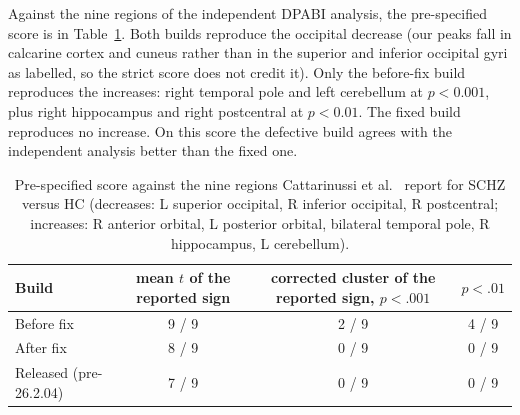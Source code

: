 \documentclass[11pt]{article}
\begin{document}
Against the nine regions of the independent DPABI analysis, the pre-specified score is in Table~\ref{tab:score}. Both builds reproduce the occipital decrease (our peaks fall in calcarine cortex and cuneus rather than in the superior and inferior occipital gyri as labelled, so the strict score does not credit it). Only the before-fix build reproduces the increases: right temporal pole and left cerebellum at $p < 0.001$, plus right hippocampus and right postcentral at $p < 0.01$. The fixed build reproduces no increase. On this score the defective build agrees with the independent analysis better than the fixed one.

\begin{table}[t]
\centering\small
\caption{Pre-specified score against the nine regions Cattarinussi et al.\ \cite{cattarinussi2024} report for SCHZ versus HC (decreases: L superior occipital, R inferior occipital, R postcentral; increases: R anterior orbital, L posterior orbital, bilateral temporal pole, R hippocampus, L cerebellum).}
\label{tab:score}
\begin{tabular}{@{}lccc@{}}
\toprule
Build & mean $t$ of the reported sign & corrected cluster of the reported sign, $p<.001$ & $p<.01$ \\
\midrule
Before fix & 9 / 9 & 2 / 9 & 4 / 9 \\
After fix & 8 / 9 & 0 / 9 & 0 / 9 \\
Released (pre-26.2.04) & 7 / 9 & 0 / 9 & 0 / 9 \\
\bottomrule
\end{tabular}
\end{table}
\end{document}

